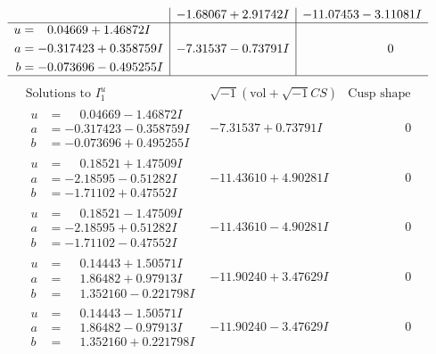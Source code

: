 \documentclass[1p]{elsarticle_modified}
\theoremstyle{definition}
\newcommand{\I}{\sqrt{-1}}
\begin{document}
$$\begin{array}{c|c|c}
 & -1.68067 + 2.91742 I & -11.07453 - 3.11081 I \\ \hline\begin{aligned}
u &= \phantom{-}0.04669 + 1.46872 I \\
a &= -0.317423 + 0.358759 I \\
b &= -0.073696 - 0.495255 I\end{aligned}
 & -7.31537 - 0.73791 I & \phantom{-0.000000 } 0\\
 \hline 
 \end{array}$$\newpage$$\begin{array}{c|c|c}  
\text{Solutions to }I^u_{1}& \I (\text{vol} + \sqrt{-1}CS) & \text{Cusp shape}\\
 \hline 
\begin{aligned}
u &= \phantom{-}0.04669 - 1.46872 I \\
a &= -0.317423 - 0.358759 I \\
b &= -0.073696 + 0.495255 I\end{aligned}
 & -7.31537 + 0.73791 I & \phantom{-0.000000 } 0 \\ \hline\begin{aligned}
u &= \phantom{-}0.18521 + 1.47509 I \\
a &= -2.18595 - 0.51282 I \\
b &= -1.71102 + 0.47552 I\end{aligned}
 & -11.43610 + 4.90281 I & \phantom{-0.000000 } 0 \\ \hline\begin{aligned}
u &= \phantom{-}0.18521 - 1.47509 I \\
a &= -2.18595 + 0.51282 I \\
b &= -1.71102 - 0.47552 I\end{aligned}
 & -11.43610 - 4.90281 I & \phantom{-0.000000 } 0 \\ \hline\begin{aligned}
u &= \phantom{-}0.14443 + 1.50571 I \\
a &= \phantom{-}1.86482 + 0.97913 I \\
b &= \phantom{-}1.352160 - 0.221798 I\end{aligned}
 & -11.90240 + 3.47629 I & \phantom{-0.000000 } 0 \\ \hline\begin{aligned}
u &= \phantom{-}0.14443 - 1.50571 I \\
a &= \phantom{-}1.86482 - 0.97913 I \\
b &= \phantom{-}1.352160 + 0.221798 I\end{aligned}
 & -11.90240 - 3.47629 I & \phantom{-0.000000 } 0 \\ \hline\begin{aligned}

\end{aligned}
\end{array}$$
\end{document}
